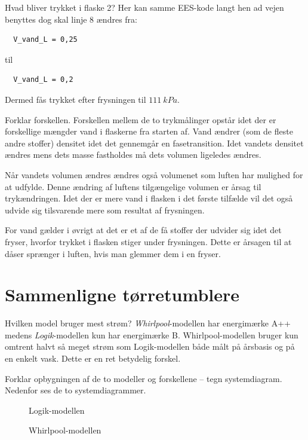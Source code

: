 \documentclass[a4paper]{article}
\begin{document}
 Hvad bliver trykket i flaske 2?
\bigbreak
Her kan samme EES-kode langt hen ad vejen benyttes dog skal linje 8 ændres fra:
\begin{verbatim}
  V_vand_L = 0,25
\end{verbatim}
til
\begin{verbatim}
  V_vand_L = 0,2
\end{verbatim}
Dermed fås trykket efter frysningen til $\qty{111}{kPa}$.

 Forklar forskellen.
\bigbreak
Forskellen mellem de to trykmålinger opstår idet der er forskellige mængder vand i flaskerne fra starten af. Vand ændrer (som de fleste andre stoffer) densitet idet det gennemgår en fasetransition. Idet vandets densitet ændres mens dets masse fastholdes må dets volumen ligeledes ændres.

Når vandets volumen ændres ændres også volumenet som luften har mulighed for at udfylde. Denne ændring af luftens tilgængelige volumen er årsag til trykændringen. Idet der er mere vand i flasken i det første tilfælde vil det også udvide sig tilsvarende mere som resultat af frysningen.

For vand gælder i øvrigt at det er et af de få stoffer der udvider sig idet det fryser, hvorfor trykket i flasken stiger under frysningen. Dette er årsagen til at dåser sprænger i luften, hvis man glemmer dem i en fryser. 

\section{Sammenligne tørretumblere}

 Hvilken model bruger mest strøm?
\bigbreak
\textit{Whirlpool}-modellen har energimærke A++ medens \textit{Logik}-modellen kun har energimærke B. Whirlpool-modellen bruger kun omtrent halvt så meget strøm som Logik-modellen både målt på årsbasis og på en enkelt vask. Dette er en ret betydelig forskel.

 Forklar opbygningen af de to modeller og forskellene -- tegn systemdiagram.
\bigbreak
Nedenfor ses de to systemdiagrammer.
\begin{figure}[ht]
  \centering
  \caption{Logik-modellen}
  \label{fig:e4}
\end{figure}
\begin{figure}[ht]
  \centering
  \caption{Whirlpool-modellen}
  \label{fig:e5}
\end{figure}
\end{document}
